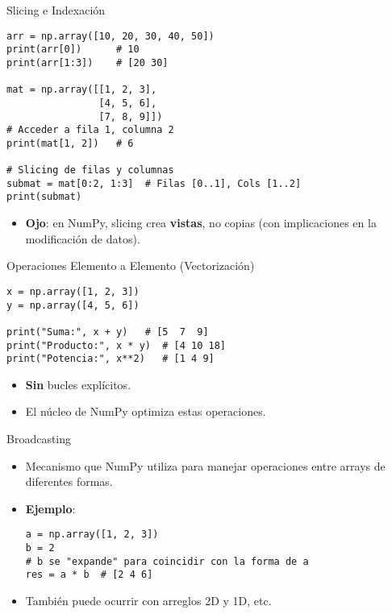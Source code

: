 \documentclass[10pt]{beamer}
\begin{document}
\begin{frame}[fragile]{Slicing e Indexación}
\begin{verbatim}
arr = np.array([10, 20, 30, 40, 50])
print(arr[0])      # 10
print(arr[1:3])    # [20 30]

mat = np.array([[1, 2, 3],
                [4, 5, 6],
                [7, 8, 9]])
# Acceder a fila 1, columna 2
print(mat[1, 2])   # 6

# Slicing de filas y columnas
submat = mat[0:2, 1:3]  # Filas [0..1], Cols [1..2]
print(submat)
\end{verbatim}
\begin{itemize}
  \item \textbf{Ojo}: en NumPy, slicing crea \textbf{vistas}, no copias (con implicaciones en la modificación de datos).
\end{itemize}
\end{frame}

\begin{frame}[fragile]{Operaciones Elemento a Elemento (Vectorización)}
\begin{verbatim}
x = np.array([1, 2, 3])
y = np.array([4, 5, 6])

print("Suma:", x + y)   # [5  7  9]
print("Producto:", x * y)  # [4 10 18]
print("Potencia:", x**2)   # [1 4 9]
\end{verbatim}
\begin{itemize}
  \item \textbf{Sin} bucles explícitos.
  \item El núcleo de NumPy optimiza estas operaciones.
\end{itemize}
\end{frame}

\begin{frame}[fragile]{Broadcasting}
  \begin{itemize}
    \item Mecanismo que NumPy utiliza para manejar operaciones entre arrays de diferentes formas.
    \item \textbf{Ejemplo}:
\begin{verbatim}
a = np.array([1, 2, 3])
b = 2
# b se "expande" para coincidir con la forma de a
res = a * b  # [2 4 6]
\end{verbatim}
    \item También puede ocurrir con arreglos 2D y 1D, etc.
  \end{itemize}
\end{frame}
\end{document}

